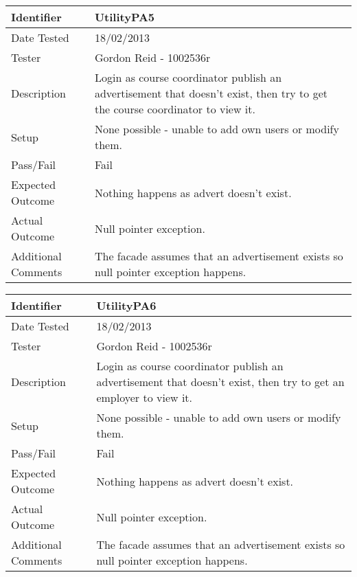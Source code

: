 \begin{tabularx}{\textwidth}{|T|L|}
\hline
Identifier & UtilityPA5\\
\hline
Date Tested & 18/02/2013\\
\hline
Tester & Gordon Reid - 1002536r\\
\hline
Description & Login as course coordinator publish an advertisement that
doesn't exist, then try to get the course coordinator to view it.\\
\hline
Setup & None possible - unable to add own users or modify them.\\
\hline
Pass/Fail & Fail\\
\hline
Expected Outcome & Nothing happens as advert doesn't exist.\\
\hline
Actual Outcome & Null pointer exception.\\
\hline
Additional Comments & The facade assumes that an advertisement exists so
null pointer exception happens.\\
\hline
\end{tabularx}

\vspace{2em}

\begin{tabularx}{\textwidth}{|T|L|}
\hline
Identifier & UtilityPA6\\
\hline
Date Tested & 18/02/2013\\
\hline
Tester & Gordon Reid - 1002536r\\
\hline
Description & Login as course coordinator publish an advertisement that
doesn't exist, then try to get an employer to view it.\\
\hline
Setup & None possible - unable to add own users or modify them.\\
\hline
Pass/Fail & Fail\\
\hline
Expected Outcome & Nothing happens as advert doesn't exist.\\
\hline
Actual Outcome & Null pointer exception.\\
\hline
Additional Comments & The facade assumes that an advertisement exists so
null pointer exception happens.\\
\hline
\end{tabularx}